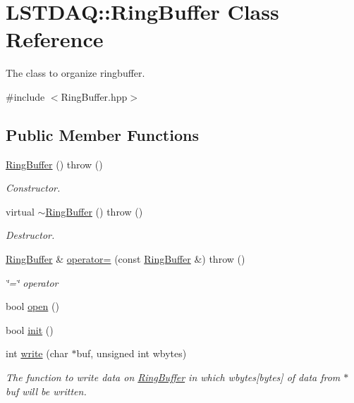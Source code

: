 \hypertarget{classLSTDAQ_1_1RingBuffer}{}\section{L\+S\+T\+D\+AQ\+:\+:Ring\+Buffer Class Reference}
\label{classLSTDAQ_1_1RingBuffer}


The class to organize ringbuffer.  




{\ttfamily \#include $<$Ring\+Buffer.\+hpp$>$}

\subsection*{Public Member Functions}
\begin{DoxyCompactItemize}
\item 
\hyperlink{classLSTDAQ_1_1RingBuffer_a73c8c103abb16180f8287045a1a3c991}{Ring\+Buffer} ()  throw ()
\begin{DoxyCompactList}\small\item\em Constructor. \end{DoxyCompactList}\item 
virtual \hyperlink{classLSTDAQ_1_1RingBuffer_a93d7015f6225d9e37fddff92aef0a8b9}{$\sim$\+Ring\+Buffer} ()  throw ()
\begin{DoxyCompactList}\small\item\em Destructor. \end{DoxyCompactList}\item 
\hyperlink{classLSTDAQ_1_1RingBuffer}{Ring\+Buffer} \& \hyperlink{classLSTDAQ_1_1RingBuffer_a018ba5a5649552fe28a226486becf9c8}{operator=} (const \hyperlink{classLSTDAQ_1_1RingBuffer}{Ring\+Buffer} \&)  throw ()
\begin{DoxyCompactList}\small\item\em \char`\"{}=\char`\"{} operator \end{DoxyCompactList}\item 
bool \hyperlink{classLSTDAQ_1_1RingBuffer_aa74541deb15ec24ed7cf50f22b3d8376}{open} ()
\item 
bool \hyperlink{classLSTDAQ_1_1RingBuffer_a1c6cee9d706927ec698eca7ee06586b2}{init} ()
\item 
int \hyperlink{classLSTDAQ_1_1RingBuffer_a6e5dd48d737d2a7cdc8e53baa97900eb}{write} (char $\ast$buf, unsigned int wbytes)
\begin{DoxyCompactList}\small\item\em The function to write data on \hyperlink{classLSTDAQ_1_1RingBuffer}{Ring\+Buffer} in which wbytes\mbox{[}bytes\mbox{]} of data from $\ast$buf will be written. \end{DoxyCompactList}\item 

\end{DoxyCompactItemize}
